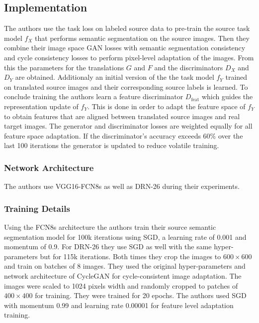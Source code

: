 \subsection{Implementation}
The authors use the task loss on labeled source data to pre-train the source task model $f_X$ that performs semantic segmentation on the source images. Then they combine their image space GAN losses with semantic segmentation consistency and cycle consistency losses to perform pixel-level adaptation of the images. From this the parameters for the translations $G$ and $F$ and the discriminators $D_X$ and $D_Y$ are obtained. Additionaly an initial version of the the task model $f_Y$ trained on translated source images and their corresponding source labels is learned. To conclude training the authors learn a feature discriminator $D_{\text{feat}}$ which guides the representation update of $f_Y$. This is done in order to adapt the feature space of $f_Y$ to obtain features that are aligned between translated source images and real target images. The generator and discriminator losses are weighted equally for all feature space adaptation. If the discriminator's accuracy exceeds $60\%$ over the last 100 iterations the generator is updated to reduce volatile training. 

\subsubsection{Network Architecture}
The authors use VGG16-FCN8s \cite{DBLP:journals/corr/LongSD14} as well as DRN-26 \cite{DBLP:journals/corr/YuKF17} during their experiments. 

\subsubsection{Training Details}
Using the FCN8s architecture the authors train their source semantic segmentation model for 100k iterations using SGD, a learning rate of 0.001 and momentum of 0.9. For DRN-26 they use SGD as well with the same hyper-parameters but for 115k iterations. Both times they crop the images to $600 \times 600$ and train on batches of 8 images. They used the original hyper-parameters and network architecture of CycleGAN \cite{DBLP:journals/corr/ZhuPIE17} for cycle-consistent image adaptation. The images were scaled to 1024 pixels width and randomly cropped to patches of $400 \times 400$ for training. They were trained for 20 epochs. The authors used SGD with momentum 0.99 and learning rate 0.00001 for feature level adaptation training. %



